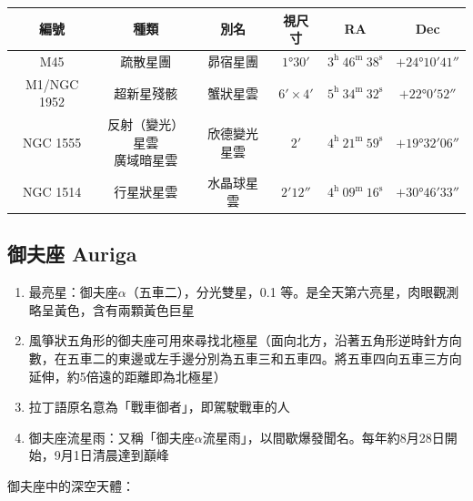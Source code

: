 \begin{center}
\begin{longtable}{c | c | c | c | c | c}
    編號 & 種類 & 別名 & 視尺寸 & RA & Dec \\
    \hline
    \endfirsthead


    \endfoot

    \endlastfoot

    M45 & 疏散星團 & 昴宿星團 & \(\ang{1;30;}\) & \(3^\text{h }46^\text{m }38^\text{s}\) & \(+\ang{24;10;41}\) \\
    M1/NGC 1952 & 超新星殘骸 & 蟹狀星雲 & \(\ang{;6;}\times\ang{;4;}\) & \(5^\text{h }34^\text{m }32^\text{s}\) & \(+\ang{22;0;52}\) \\
    NGC 1555 & \makecell{反射（變光）星雲\\廣域暗星雲} & 欣德變光星雲 & \(\ang{;2;}\) & \(4^\text{h }21^\text{m }59^\text{s}\) & \(+\ang{19;32;06}\) \\
    NGC 1514 & 行星狀星雲 & 水晶球星雲 & \(\ang{;2;12}\) & \(4^\text{h }09^\text{m }16^\text{s}\) & \(+\ang{30;46;33}\)
\end{longtable}
\end{center}

\subsection{御夫座 Auriga}
\begin{enumerate}
    \item 最亮星：御夫座\(\alpha\)（五車二），分光雙星，0.1 等。是全天第六亮星，肉眼觀測略呈黃色，含有兩顆黃色巨星
    \item 風箏狀五角形的御夫座可用來尋找北極星（面向北方，沿著五角形逆時針方向數，在五車二的東邊或左手邊分別為五車三和五車四。將五車四向五車三方向延伸，約5倍遠的距離即為北極星）
    \item 拉丁語原名意為「戰車御者」，即駕駛戰車的人
    \item 御夫座流星雨：又稱「御夫座\(\alpha\)流星雨」，以間歇爆發聞名。每年約8月28日開始，9月1日清晨達到巔峰
\end{enumerate}
御夫座中的深空天體：

